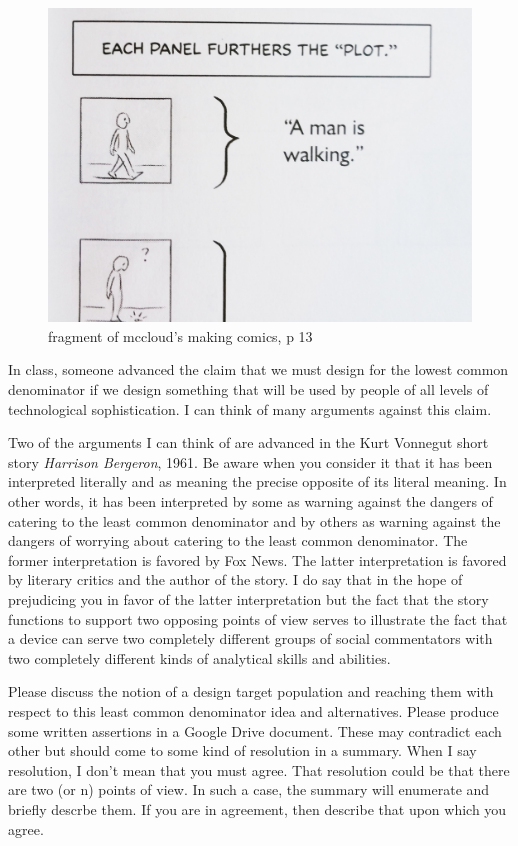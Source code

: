 \begin{figure}
\centering
\includegraphics{./fiPickingKey.jpg}
\caption{fragment of mccloud's making comics, p 13}
\end{figure}

\hypertarget{harrison-bergeron}{%
\label{harrison-bergeron}}

In class, someone advanced the claim that we must design for the lowest
common denominator if we design something that will be used by people of
all levels of technological sophistication. I can think of many
arguments against this claim.

Two of the arguments I can think of are advanced in the Kurt Vonnegut
short story \emph{Harrison Bergeron}, 1961. Be aware when you consider
it that it has been interpreted literally and as meaning the precise
opposite of its literal meaning. In other words, it has been interpreted
by some as warning against the dangers of catering to the least common
denominator and by others as warning against the dangers of worrying
about catering to the least common denominator. The former
interpretation is favored by Fox News. The latter interpretation is
favored by literary critics and the author of the story. I do say that
in the hope of prejudicing you in favor of the latter interpretation but
the fact that the story functions to support two opposing points of view
serves to illustrate the fact that a device can serve two completely
different groups of social commentators with two completely different
kinds of analytical skills and abilities.

Please discuss the notion of a design target population and reaching
them with respect to this least common denominator idea and
alternatives. Please produce some written assertions in a Google Drive
document. These may contradict each other but should come to some kind
of resolution in a summary. When I say resolution, I don't mean that you
must agree. That resolution could be that there are two (or n) points of
view. In such a case, the summary will enumerate and briefly descrbe
them. If you are in agreement, then describe that upon which you agree.

